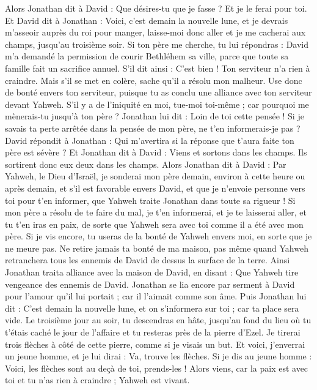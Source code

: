 \begin{multicols}{2}
Alors Jonathan dit à David : Que désires-tu que je fasse ? Et je le ferai pour toi.
Et David dit à Jonathan : Voici, c'est demain la nouvelle lune, et je devrais m'asseoir auprès du roi pour manger, laisse-moi donc aller et je me cacherai aux champs, jusqu'au troisième soir.
Si ton père me cherche, tu lui répondras : David m'a demandé la permission de courir Bethléhem sa ville, parce que toute sa famille fait un sacrifice annuel.
S'il dit ainsi : C’est bien ! Ton serviteur n’a rien à craindre. Mais s'il se met en colère, sache qu’il a résolu mon malheur.
Use donc de bonté envers ton serviteur, puisque tu as conclu une alliance avec ton serviteur devant Yahweh. S'il y a de l’iniquité en moi, tue-moi toi-même ; car pourquoi me mènerais-tu jusqu’à ton père ?
Jonathan lui dit : Loin de toi cette pensée ! Si je savais ta perte arrêtée dans la pensée de mon père, ne t’en informerais-je pas ?
David répondit à Jonathan : Qui m’avertira si la réponse que t'aura faite ton père est sévère ?
Et Jonathan dit à David : Viens et sortons dans les champs. Ils sortirent donc eux deux dans les champs.
Alors Jonathan dit à David : Par Yahweh, le Dieu d'Israël, je sonderai mon père demain, environ à cette heure ou après demain, et s’il est favorable envers David, et que je n'envoie personne vers toi pour t’en informer,
que Yahweh traite Jonathan dans toute sa rigueur ! Si mon père a résolu de te faire du mal, je t’en informerai, et je te laisserai aller, et tu t'en iras en paix, de sorte que Yahweh sera avec toi comme il a été avec mon père.
Si je vis encore, tu useras de la bonté de Yahweh envers moi, en sorte que je ne meure pas.
Ne retire jamais ta bonté de ma maison, pas même quand Yahweh retranchera tous les ennemis de David de dessus la surface de la terre.
Ainsi Jonathan traita alliance avec la maison de David, en disant : Que Yahweh tire vengeance des ennemis de David.
Jonathan se lia encore par serment à David pour l'amour qu'il lui portait ; car il l'aimait comme son âme.
Puis Jonathan lui dit : C'est demain la nouvelle lune, et on s'informera sur toi ; car ta place sera vide.
Le troisième jour au soir, tu descendras en hâte, jusqu’au fond du lieu où tu t’étais caché le jour de l’affaire et tu resteras près de la pierre d'Ezel.
Je tirerai trois flèches à côté de cette pierre, comme si je visais un but.
Et voici, j'enverrai un jeune homme, et je lui dirai : Va, trouve les flèches. Si je dis au jeune homme : Voici, les flèches sont au deçà de toi, prends-les ! Alors viens, car la paix est avec toi et tu n’as rien à craindre ; Yahweh est vivant.

\end{multicols}
